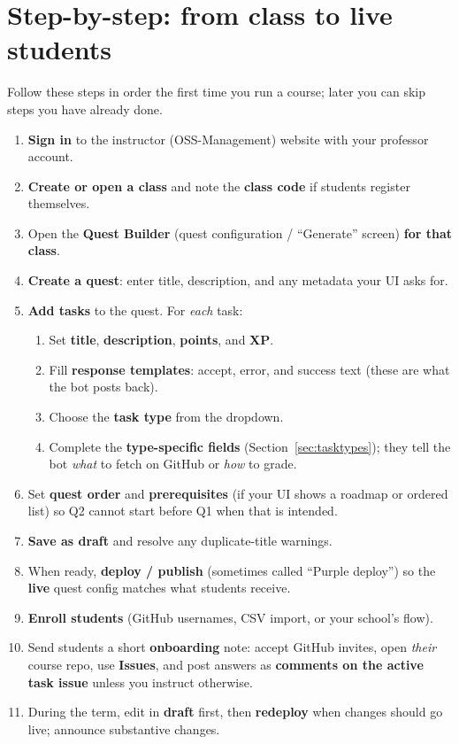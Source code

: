 \documentclass[11pt,a4paper]{article}
\begin{document}
\section{Step-by-step: from class to live students}
\label{sec:steps}

Follow these steps in order the first time you run a course; later you can skip steps you have already done.

\begin{enumerate}[leftmargin=*,itemsep=0.35em]
  \item \textbf{Sign in} to the instructor (OSS-Management) website with your professor account.
  \item \textbf{Create or open a class} and note the \textbf{class code} if students register themselves.
  \item Open the \textbf{Quest Builder} (quest configuration / ``Generate'' screen) \textbf{for that class}.
  \item \textbf{Create a quest}: enter title, description, and any metadata your UI asks for.
  \item \textbf{Add tasks} to the quest. For \emph{each} task:
    \begin{enumerate}[label=\alph*),itemsep=0.2em]
      \item Set \textbf{title}, \textbf{description}, \textbf{points}, and \textbf{XP}.
      \item Fill \textbf{response templates}: accept, error, and success text (these are what the bot posts back).
      \item Choose the \textbf{task type} from the dropdown.
      \item Complete the \textbf{type-specific fields} (Section~\ref{sec:tasktypes}); they tell the bot \emph{what} to fetch on GitHub or \emph{how} to grade.
    \end{enumerate}
  \item Set \textbf{quest order} and \textbf{prerequisites} (if your UI shows a roadmap or ordered list) so Q2 cannot start before Q1 when that is intended.
  \item \textbf{Save as draft} and resolve any duplicate-title warnings.
  \item When ready, \textbf{deploy / publish} (sometimes called ``Purple deploy'') so the \textbf{live} quest config matches what students receive.
  \item \textbf{Enroll students} (GitHub usernames, CSV import, or your school's flow).
  \item Send students a short \textbf{onboarding} note: accept GitHub invites, open \emph{their} course repo, use \textbf{Issues}, and post answers as \textbf{comments on the active task issue} unless you instruct otherwise.
  \item During the term, edit in \textbf{draft} first, then \textbf{redeploy} when changes should go live; announce substantive changes.
\end{enumerate}
\end{document}
